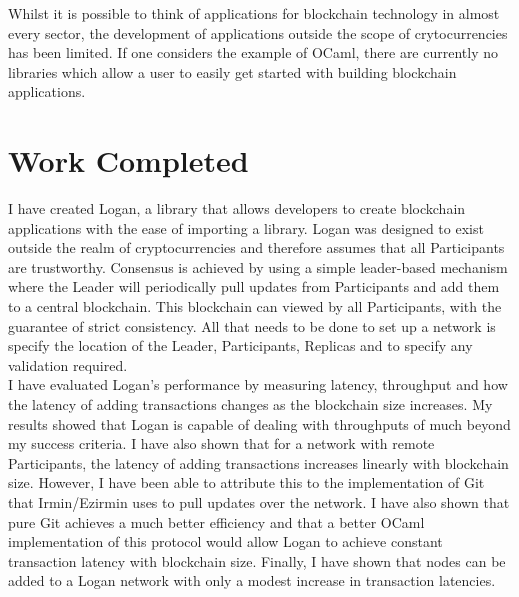 \documentclass[12pt,a4paper,twoside,openright]{report}
\begin{document}
	Whilst it is possible to think of applications for blockchain technology in almost every sector, the development of applications outside the scope of crytocurrencies has been limited. 
	If one considers the example of OCaml, there are currently no libraries which allow a user to easily get started with building blockchain applications. \\

	\section{Work Completed}
	I have created Logan, a library that allows developers to create blockchain applications with the ease of importing a library.
	Logan was designed to exist outside the realm of cryptocurrencies and therefore assumes that all Participants are trustworthy.
	Consensus is achieved by using a simple leader-based mechanism where the Leader will periodically pull updates from Participants and add them to a central blockchain.
	This blockchain can viewed by all Participants, with the guarantee of strict consistency.
	All that needs to be done to set up a network is specify the location of the Leader, Participants, Replicas and to specify any validation required.\\
	
	I have evaluated Logan's performance by measuring latency, throughput and how the latency of adding transactions changes as the blockchain size increases.
	My results showed that Logan is capable of dealing with throughputs of much beyond my success criteria.
	I have also shown that for a network with remote Participants, the latency of adding transactions increases linearly with blockchain size. 
	However, I have been able to attribute this to the implementation of Git that Irmin/Ezirmin uses to pull updates over the network. 
	I have also shown that pure Git achieves a much better efficiency and that a better OCaml implementation of this protocol would allow Logan to achieve constant transaction latency with blockchain size.
	Finally, I have shown that nodes can be added to a Logan network with only a modest increase in transaction latencies.
\end{document}
